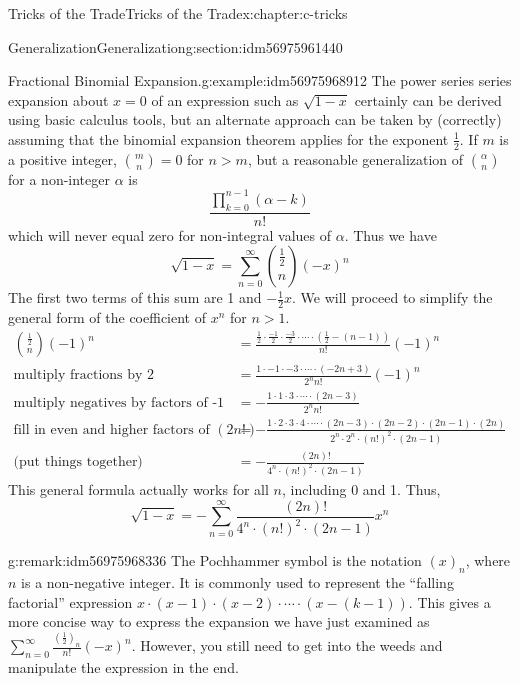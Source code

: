 \documentclass[twoside,10pt,]{book}
\numberwithin{equation}{section}
\newcommand{\gt}{>}
\begin{document}
\begin{chapterptx}{Tricks of the Trade}{}{Tricks of the Trade}{}{}{x:chapter:c-tricks}
\begin{sectionptx}{Generalization}{}{Generalization}{}{}{g:section:idm56975961440}
\begin{example}{Fractional Binomial Expansion.}{g:example:idm56975968912}%
%
The power series series expansion about \(x=0\) of an expression such as \(\sqrt{1-x}\) certainly can be derived using basic calculus tools, but an alternate approach can be taken by (correctly) assuming that the binomial expansion theorem applies for the exponent \(\frac{1}{2}\).  If \(m\) is a positive integer, \(\binom{m}{n} =0\) for \(n \gt m\), but a reasonable generalization of \(\binom{\alpha}{n}\) for a non-integer \(\alpha\) is%
\begin{equation*}
\frac{\prod_{k=0}^{n-1} (\alpha-k)}{n!}
\end{equation*}
which will never equal zero for non-integral values of \(\alpha\).  Thus we have%
\begin{equation*}
\sqrt{1-x} = \sum_{n=0}^{\infty} \binom{\frac{1}{2}}{n} (-x)^n
\end{equation*}
The first two terms of this sum are 1 and \(-\frac{1}{2} x\). We will proceed to simplify the general form of the coefficient of \(x^n\) for \(n \gt 1\).%
\begin{equation*}
\begin{split}
\binom{\frac{1}{2}}{n} (-1)^n
&=  \frac{\frac{1}{2} \cdot\frac{-1}{2}\cdot\frac{-3}{2}\cdot \cdots \cdot(\frac{1}{2}-(n-1)) }{n!} (-1)^n\\
\textrm{multiply fractions by 2 }	&=  \frac{1 \cdot -1 \cdot -3 \cdot \cdots \cdot (-2n+3)}{2^{n} n!} (-1)^n\\
\textrm{multiply negatives by factors of -1}	&= - \frac{1 \cdot 1 \cdot 3 \cdot \cdots \cdot (2n-3)}{2^{n} n!}  \\
\textrm{fill in even and higher factors of }(2n!)	&= - \frac{ 1 \cdot 2 \cdot 3\cdot 4 \cdot \cdots \cdot (2n-3)\cdot (2n-2)\cdot (2n-1)\cdot (2n)}{2^n\cdot 2^n\cdot (n!)^2 \cdot (2n-1)}  \\
\textrm{(put things together)}	&= - \frac{(2n)!}{4^n \cdot(n!)^2\cdot (2n-1)} 
\end{split}
\end{equation*}
This general formula actually works for all \(n\), including 0 and 1.   Thus,%
\begin{equation*}
\sqrt{1-x}  = - \sum_{n=0}^{\infty} \frac{(2n)!}{4^n \cdot(n!)^2\cdot (2n-1)}  x^n  
\end{equation*}
%
\end{example}
\begin{remark}{}{g:remark:idm56975968336}%
 The Pochhammer symbol is the notation  \((x)_n\), where \(n\) is a non-negative integer. It is commonly used to represent the ``falling factorial'' expression  \(x\cdot(x-1)\cdot(x-2)\cdot \cdots \cdot (x-(k-1))\).  This gives a more concise way to express the expansion we have just examined as \(\sum_{n=0}^{\infty} \frac{(\frac{1}{2})_n}{n!} (-x)^n\).  However, you still need to get into the weeds and manipulate the expression in the end.%

\end{remark}
\end{sectionptx}
\end{chapterptx}
\end{document}
